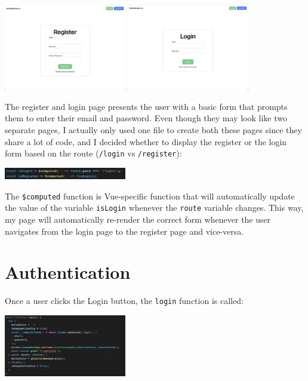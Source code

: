 \documentclass[notitlepage, 12pt]{report}
\newcommand{\code}[1]{\texttt{#1}}
\begin{document}
\includegraphics[width=0.4\textwidth]{frontend-register-page.png}
\includegraphics[width=0.4\textwidth]{frontend-login-page.png}

The register and login page presents the user with a basic form that prompts them to enter their email and password. Even though they may look like two separate pages, I actually only used one file to create both these pages since they share a lot of code, and I decided whether to display the register or the login form based on the route (\code{/login} vs \code{/register}):

\includegraphics[width=0.4\textwidth]{frontend-entry-page-route.png}

The \code{\$computed} function is Vue-specific function that will automatically update the value of the variable \code{isLogin} whenever the \code{route} variable changes. This way, my page will automatically re-render the correct form whenever the user navigates from the login page to the register page and vice-versa.

\section*{Authentication}

Once a user clicks the Login button, the \code{login} function is called:

\includegraphics[width=0.4\textwidth]{frontend-login-function.png}
\end{document}
